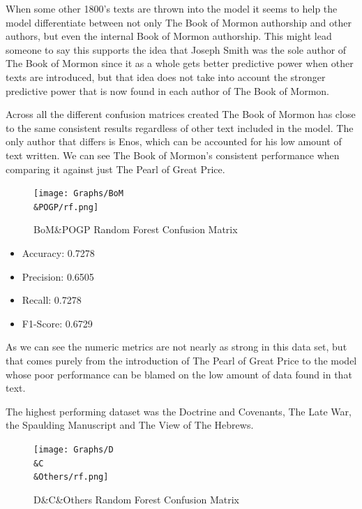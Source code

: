 \documentclass[
  letterpaper,
  DIV=11,
  numbers=noendperiod]{scrartcl}
\providecommand{\tightlist}{%
  \setlength{\itemsep}{0pt}\setlength{\parskip}{0pt}}\usepackage{longtable,booktabs,array}
\begin{document}
When some other 1800's texts are thrown into the model it seems to help
the model differentiate between not only The Book of Mormon authorship
and other authors, but even the internal Book of Mormon authorship. This
might lead someone to say this supports the idea that Joseph Smith was
the sole author of The Book of Mormon since it as a whole gets better
predictive power when other texts are introduced, but that idea does not
take into account the stronger predictive power that is now found in
each author of The Book of Mormon.

Across all the different confusion matrices created The Book of Mormon
has close to the same consistent results regardless of other text
included in the model. The only author that differs is Enos, which can
be accounted for his low amount of text written. We can see The Book of
Mormon's consistent performance when comparing it against just The Pearl
of Great Price.

\begin{figure}

{\centering \texttt{[image: Graphs/BoM\\\&POGP/rf.png]}

}

\caption{BoM\&POGP Random Forest Confusion Matrix}

\end{figure}

\begin{itemize}
\tightlist
\item
  Accuracy: 0.7278
\item
  Precision: 0.6505
\item
  Recall: 0.7278
\item
  F1-Score: 0.6729
\end{itemize}

As we can see the numeric metrics are not nearly as strong in this data
set, but that comes purely from the introduction of The Pearl of Great
Price to the model whose poor performance can be blamed on the low
amount of data found in that text.

The highest performing dataset was the Doctrine and Covenants, The Late
War, the Spaulding Manuscript and The View of The Hebrews.

\begin{figure}

{\centering \texttt{[image: Graphs/D\\\&C\\\&Others/rf.png]}

}

\caption{D\&C\&Others Random Forest Confusion Matrix}

\end{figure}
\end{document}
